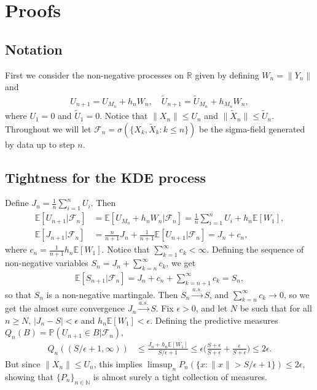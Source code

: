 \documentclass[12pt]{article}
\newcommand{\R}{\mathbb{R}}
\newcommand{\N}{\mathbb{N}}
\newcommand{\E}{\mathbb{E}}
\newcommand{\bP}{\mathbb{P}}
\newcommand{\F}{\mathcal{F}}
\begin{document}
\section{Proofs}\label{sec-proof}

\subsection{Notation}
First we consider the non-negative processes on $\R$ given by defining $W_n = \|Y_n\|$ and
\begin{align*}
    U_{n + 1} = U_{M_n} + h_{n} W_n, \quad \tilde{U}_{n + 1} = \tilde{U}_{M_n} + h_{M_n} W_n,
\end{align*}
where $U_1 = 0$ and $\tilde{U}_1 = 0$.
Notice that $\|X_n\| \leq U_n$ and $\|\tilde{X}_n\| \leq \tilde{U}_n$. Throughout we will let $\F_n = \sigma(\{X_k, \tilde{X}_k : k \leq n\})$ be the sigma-field generated by data up to step $n$.

\subsection{Tightness for the KDE process}

Define $J_n = \frac{1}{n}\sum_{i = 1}^n U_i$. Then
\begin{align*}
    \E[U_{n+1}| \F_n] &= \E[U_{M_n} + h_n W_n | \F_n] = \frac{1}{n}\sum_{i = 1}^n U_i + h_n \E[W_1],\\
    \E[J_{n+1} | \F_n] &= \frac{n}{n+1} J_n + \frac{1}{n+1} \E[U_{n + 1} | \F_n]  = J_n + c_n,
\end{align*}
where $c_n = \frac{1}{n+1} h_n \E[W_1]$. Notice that $\sum_{k = 1}^\infty c_k < \infty$. Defining the sequence of non-negative variables $S_n = J_n + \sum_{k = n}^\infty c_k$, we get
\begin{align*}
    \E[S_{n+1} | \F_n] = J_n + c_n + \sum_{k = n + 1}^\infty c_k = S_n,
\end{align*}
so that $S_n$ is a non-negative martingale. Then $S_n \overset{a.s.}{\to} S$, and $\sum_{k = n}^\infty c_k \to 0$, so we get the almost sure convergence $J_n \overset{a.s.}{\to} S$.
Fix $\epsilon > 0$, and let $N$ be such that for all $n \geq N$, $|J_n - S| < \epsilon$ and $h_n \E[W_1] < \epsilon$. Defining the predictive measures $Q_n(B) = \bP(U_{n+1} \in B | \F_n)$, 
\begin{align*}
    Q_n((S/\epsilon + 1, \infty))  &\leq \frac{J_n + h_n \E[W_1]}{S/\epsilon + 1} \leq \epsilon\Big(\frac{S + \epsilon}{S + \epsilon} + \frac{\epsilon}{S + \epsilon}\Big) \leq 2\epsilon.
\end{align*}
But since $\|X_n\| \leq U_n$, this implies $\limsup_n P_n(\{ x: \|x\| > S/\epsilon + 1\}) \leq 2\epsilon$, showing that $\{P_n\}_{n \in \N}$ is almost surely a tight collection of measures.
\end{document}
